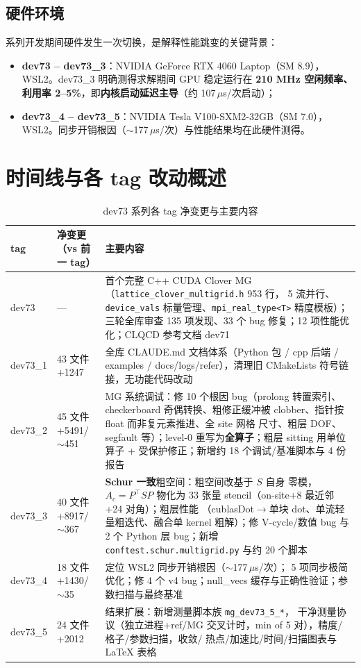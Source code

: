 \documentclass[11pt,a4paper]{article}
\begin{document}
\subsection{硬件环境}
\label{sec:hardware}

系列开发期间硬件发生一次切换，是解释性能跳变的关键背景：
\begin{itemize}
  \item \textbf{dev73 -- dev73\_3}：NVIDIA GeForce RTX 4060 Laptop（SM 8.9），
        WSL2。dev73\_3 明确测得求解期间 GPU 稳定运行在 \textbf{210 MHz 空闲频率、
        利用率 2--5\%}，即\textbf{内核启动延迟主导}（约 107\,$\mu$s/次启动）；
  \item \textbf{dev73\_4 -- dev73\_5}：NVIDIA Tesla V100-SXM2-32GB（SM 7.0），
        WSL2。同步开销根因（$\sim$177\,$\mu$s/次）与性能结果均在此硬件测得。
\end{itemize}

\section{时间线与各 tag 改动概述}
\label{sec:timeline}

\begin{table}[H]
\centering
\small
\begin{tabular}{p{1.7cm}p{3.4cm}p{9.5cm}}
\toprule
tag & 净变更（vs 前一 tag） & 主要内容 \\
\midrule
dev73 & — & 首个完整 C++ CUDA Clover MG（\texttt{lattice\_clover\_multigrid.h} 953 行，
5 流并行、\texttt{device\_vals} 标量管理、\texttt{mpi\_real\_type<T>} 精度模板）；
三轮全库审查 135 项发现、33 个 bug 修复；12 项性能优化；CLQCD 参考文档 dev71 \\
dev73\_1 & 43 文件 +1247 & 全库 CLAUDE.md 文档体系（Python 包 / cpp 后端 / examples /
docs/logs/refer），清理旧 CMakeLists 符号链接，无功能代码改动 \\
dev73\_2 & 45 文件 +5491/$\sim$451 & MG 系统调试：修 10 个根因 bug（prolong 转置索引、
checkerboard 奇偶转换、粗修正缓冲被 clobber、指针按 float 而非复元素推进、全 site 网格
尺寸、粗层 DOF、segfault 等）；level-0 重写为\textbf{全算子}；粗层 sitting 用单位算子 +
受保护修正；新增约 18 个调试/基准脚本与 4 份报告 \\
dev73\_3 & 40 文件 +8917/$\sim$367 & \textbf{Schur 一致}粗空间：粗空间改基于 $S$ 自身
零模，$A_c=P^\top S P$ 物化为 33 张量 stencil（on-site+8 最近邻+24 对角）；粗层性能
（cublasDot$\to$单块 dot、单流轻量粗迭代、融合单 kernel 粗解）；修 V-cycle/数值 bug
与 2 个 Python 层 bug；新增 \texttt{conftest.schur.multigrid.py} 与约 20 个脚本 \\
dev73\_4 & 18 文件 +1430/$\sim$35 & 定位 WSL2 同步开销根因（$\sim$177\,$\mu$s/次）；
5 项同步极简优化；修 4 个 v4 bug；null\_vecs 缓存与正确性验证；参数扫描与最终基准 \\
dev73\_5 & 24 文件 +2012 & 结果扩展：新增测量脚本族 \texttt{mg\_dev73\_5\_*}，
干净测量协议（独立进程+ref/MG 交叉计时，min of 5 对），精度/格子/参数扫描，收敛/
热点/加速比/时间/扫描图表与 LaTeX 表格 \\
\bottomrule
\end{tabular}
\caption{dev73 系列各 tag 净变更与主要内容}
\end{table}
\end{document}
